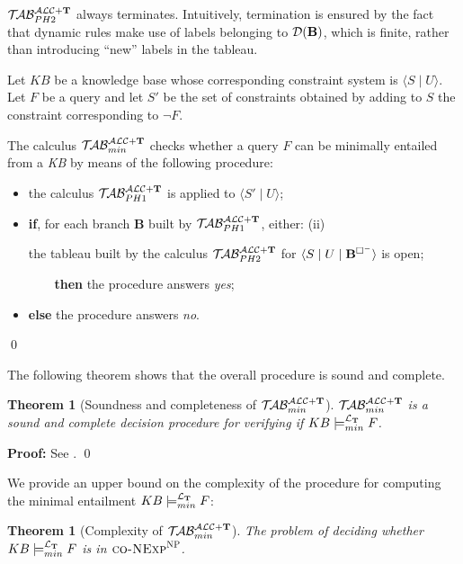 \documentclass[a4paper, 11pt, oneside]{duthesis}
\newcommand{\tip}{{\bf T}}
\newcommand{\nott} {\lnot}
\newcommand{\tc} {\mid}
\newcommand{\bbox}{\square}
\newcommand{\sx} {\langle}
\newcommand{\dx} {\rangle}
\newcommand{\db}{\mathcal{D}(\mbox{\bf B})}
\newcommand{\ellet} {\mathcal{L}_{\bf T}}
\newcommand{\nuovoc}{\mathrel{{\mathcal{T}\!\mathcal{AB}}}_{min}^{\mathcal{ALC}+\mbox{\scriptsize $\tip$}}}
\newcommand{\primo}{\mathrel{{\mathcal{T}\!\mathcal{AB}}}_{PH 1}^{\mathcal{ALC}+\mbox{\scriptsize $\tip$}}}
\newcommand{\secondo}{\mathrel{{\mathcal{T}\!\mathcal{AB}}}_{PH 2}^{\mathcal{ALC}+\mbox{\scriptsize $\tip$}}}
\newenvironment{proof}
{\begin{trivlist} \item[] {\bf Proof:}}%
{\qed \end{trivlist}}
\newenvironment{definition}
{\begin{defi} \rm}{\qed \end{defi}}
\newenvironment{proof}
{\begin{trivlist} \item[] {\bf Proof:}}%
{\qed \end{trivlist}}
\newenvironment{definition}
{\begin{defi} \rm}{\qed \end{defi}}
\newtheorem{theorem}{Theorem}
\newtheorem{definition}{Definition}
\newcounter{posu}
\newtheorem{theorem}[posu]{Theorem}
\newtheorem{definition}[posu]{Definition}
\newtheorem{proof}[posu]{Proof}
\begin{document}
\newpage

$\secondo$ always terminates.
Intuitively, termination is ensured by the fact that dynamic rules make use of labels belonging to $\db$, which is finite, rather than introducing ``new'' labels in the tableau.


\begin{definition}\label{def processo}
Let $KB$ be a knowledge base whose corresponding constraint system is $\sx S \tc U \dx$. Let $F$ be a query and let $S'$ be the set of constraints obtained by adding to $S$ the constraint corresponding to $\nott F$.

The calculus $\nuovoc$ checks whether a query $F$ can be minimally entailed from a \emph{KB} by means of the following procedure:
\begin{itemize}
\item the calculus $\primo$ is applied to $\sx S' \tc U \dx$;
\item \textbf{if}, for each branch {\bf B} built by $\primo$, either:
	\subitem(ii) {the tableau built by the calculus $\secondo$ for $\sx S \tc U \tc {\bf
B}^{\bbox^{-}} \dx$ is open;

\verb$    $\textbf{then} the procedure answers \emph{yes};}
\item[] \textbf{else} the procedure answers \emph{no}.
\end{itemize}
\end{definition}

\noindent The following theorem shows that the overall procedure is sound and complete.

\begin{theorem}[Soundness and completeness of $\nuovoc$]\label{Soundness e completeness nuovoc} $\nuovoc$ is  a sound and complete decision procedure for verifying if $KB \models_{min}^{\ellet} F$.
\end{theorem}

\begin{proof}
See \cite{Giordano:2013:NDL:2435476.2435957}.
\end{proof}

We provide an upper bound on the complexity of the procedure for computing the minimal entailment $KB \models_{min}^{\ellet} F$:

\begin{theorem}[Complexity of $\nuovoc$]\label{overall_complexity}
The problem of deciding whether $KB \models_{min}^{\ellet} F$ is in $\textsc{co-NExp}^\textsc{NP}$.
\end{theorem}
\end{document}
